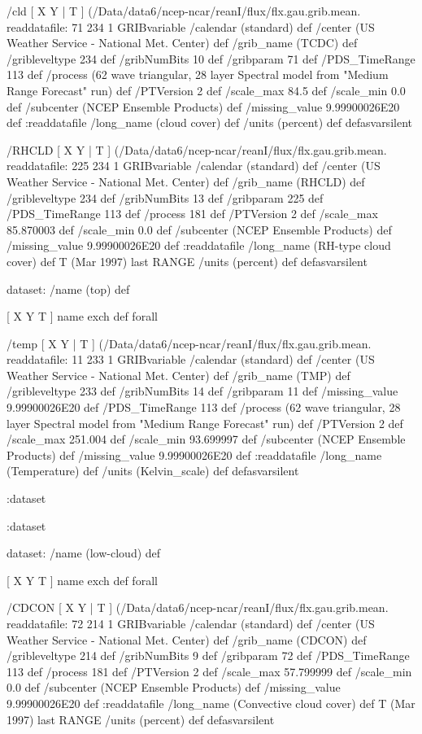 \begin{ingrid}
  /cld { [ X Y | T ] (/Data/data6/ncep-ncar/reanI/flux/flx.gau.grib.mean.%
  readdatafile:
  71 234 1 GRIBvariable
  /calendar (standard) def
  /center (US Weather Service - National Met. Center) def
  /grib_name (TCDC) def
  /gribleveltype 234 def
  /gribNumBits 10 def
  /gribparam 71 def
  /PDS_TimeRange 113 def
  /process (62 wave triangular, 28 layer Spectral model from "Medium Range Forecast" run) def
  /PTVersion 2 def
  /scale_max 84.5 def
  /scale_min 0.0 def
  /subcenter (NCEP Ensemble Products) def
  /missing_value 9.99900026E20 def
  :readdatafile
  /long_name (cloud cover) def
  /units (percent) def
  } defasvarsilent

  /RHCLD { [ X Y | T ] (/Data/data6/ncep-ncar/reanI/flux/flx.gau.grib.mean.%
  readdatafile:
  225 234 1 GRIBvariable
  /calendar (standard) def
  /center (US Weather Service - National Met. Center) def
  /grib_name (RHCLD) def
  /gribleveltype 234 def
  /gribNumBits 13 def
  /gribparam 225 def
  /PDS_TimeRange 113 def
  /process 181 def
  /PTVersion 2 def
  /scale_max 85.870003 def
  /scale_min 0.0 def
  /subcenter (NCEP Ensemble Products) def
  /missing_value 9.99900026E20 def
  :readdatafile
  /long_name (RH-type cloud cover) def
  T (Mar 1997) last RANGE
  /units (percent) def
  } defasvarsilent

  dataset: /name (top) def

   [ X Y T ] { name exch def } forall

   /temp { [ X Y | T ] (/Data/data6/ncep-ncar/reanI/flux/flx.gau.grib.mean.%
   readdatafile:
   11 233 1 GRIBvariable
   /calendar (standard) def
   /center (US Weather Service - National Met. Center) def
   /grib_name (TMP) def
   /gribleveltype 233 def
   /gribNumBits 14 def
   /gribparam 11 def
   /missing_value 9.99900026E20 def
   /PDS_TimeRange 113 def
   /process (62 wave triangular, 28 layer Spectral model from "Medium Range Forecast" run) def
   /PTVersion 2 def
   /scale_max 251.004 def
   /scale_min 93.699997 def
   /subcenter (NCEP Ensemble Products) def
   /missing_value 9.99900026E20 def
   :readdatafile
   /long_name (Temperature) def
   /units (Kelvin_scale) def
   } defasvarsilent

  :dataset

 :dataset

 dataset: /name (low-cloud) def

  [ X Y T ] { name exch def } forall

  /CDCON { [ X Y | T ] (/Data/data6/ncep-ncar/reanI/flux/flx.gau.grib.mean.%
  readdatafile:
  72 214 1 GRIBvariable
  /calendar (standard) def
  /center (US Weather Service - National Met. Center) def
  /grib_name (CDCON) def
  /gribleveltype 214 def
  /gribNumBits 9 def
  /gribparam 72 def
  /PDS_TimeRange 113 def
  /process 181 def
  /PTVersion 2 def
  /scale_max 57.799999 def
  /scale_min 0.0 def
  /subcenter (NCEP Ensemble Products) def
  /missing_value 9.99900026E20 def
  :readdatafile
  /long_name (Convective cloud cover) def
  T (Mar 1997) last RANGE
  /units (percent) def
  } defasvarsilent


\end{ingrid}
